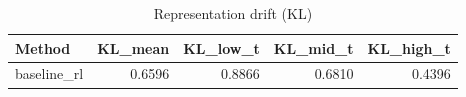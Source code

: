 \begin{table}[htbp]
\centering
\caption{Representation drift (KL)}
\label{tab:repr-drift}
\begin{tabular}{lrrrr}
\toprule
\textbf{Method} & \textbf{KL\_mean} & \textbf{KL\_low\_t} & \textbf{KL\_mid\_t} & \textbf{KL\_high\_t} \\
\midrule
baseline\_rl & 0.6596 & 0.8866 & 0.6810 & 0.4396 \\
\bottomrule
\end{tabular}
\end{table}